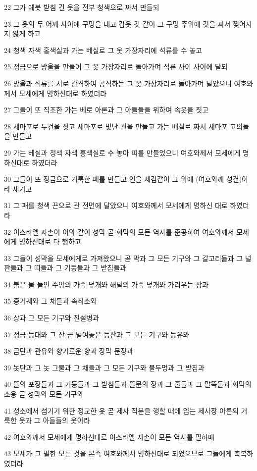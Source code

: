\par 22 그가 에봇 받침 긴 옷을 전부 청색으로 짜서 만들되
\par 23 그 옷의 두 어깨 사이에 구멍을 내고 갑옷 깃 같이 그 구멍 주위에 깃을 짜서 찢어지지 않게 하고
\par 24 청색 자색 홍색실과 가는 베실로 그 옷 가장자리에 석류를 수 놓고
\par 25 정금으로 방울을 만들어 그 옷 가장자리로 돌아가며 석류 사이 사이에 달되
\par 26 방울과 석류를 서로 간격하여 공직하는 그 옷 가장자리로 돌아가며 달았으니 여호와께서 모세에게 명하신대로 하였더라
\par 27 그들이 또 직조한 가는 베로 아론과 그 아들들을 위하여 속옷을 짓고
\par 28 세마포로 두건을 짓고 세마포로 빛난 관을 만들고 가는 베실로 짜서 세마포 고의들을 만들고
\par 29 가는 베실과 청색 자색 홍색실로 수 놓아 띠를 만들었으니 여호와께서 모세에게 명하신대로 하였더라
\par 30 그들이 또 정금으로 거룩한 패를 만들고 인을 새김같이 그 위에 (여호와께 성결)이라 새기고
\par 31 그 패를 청색 끈으로 관 전면에 달았으니 여호와께서 모세에게 명하신 대로 하였더라
\par 32 이스라엘 자손이 이와 같이 성막 곧 회막의 모든 역사를 준공하여 여호와께서 모세에게 명하신대로 다 행하고
\par 33 그들이 성막을 모세에게로 가져왔으니 곧 막과 그 모든 기구와 그 갈고리들과 그 널판들과 그 띠들과 그 기둥들과 그 받침들과
\par 34 붉은 물 들인 수양의 가죽 덮개와 해달의 가죽 덮개와 가리우는 장과
\par 35 증거궤와 그 채들과 속죄소와
\par 36 상과 그 모든 기구와 진설병과
\par 37 정금 등대와 그 잔 곧 벌여놓은 등잔과 그 모든 기구와 등유와
\par 38 금단과 관유와 향기로운 향과 장막 문장과
\par 39 놋단과 그 놋 그물과 그 채들과 그 모든 기구와 물두멍과 그 받침과
\par 40 뜰의 포장들과 그 기둥들과 그 받침들과 뜰문의 장과 그 줄들과 그 말뚝들과 회막의 소용 곧 성막의 모든 기구와
\par 41 성소에서 섬기기 위한 정교한 옷 곧 제사 직분을 행할 때에 입는 제사장 아론의 거룩한 옷과 그 아들들의 옷이라
\par 42 여호와께서 모세에게 명하신대로 이스라엘 자손이 모든 역사를 필하매
\par 43 모세가 그 필한 모든 것을 본즉 여호와께서 명하신대로 되었으므로 그들에게 축복하였더라

